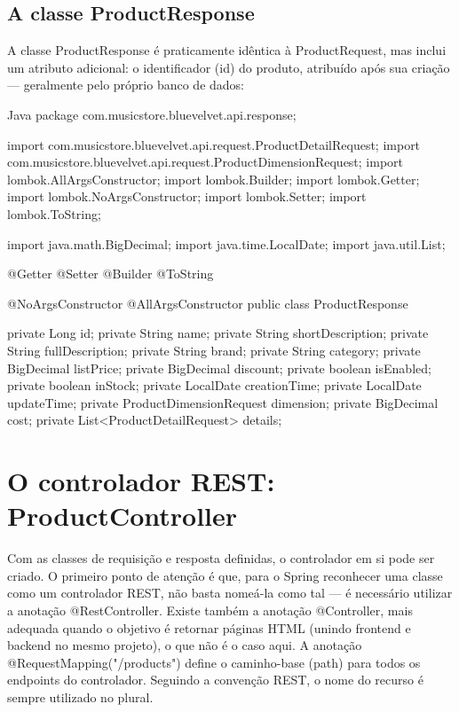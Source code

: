 \subsection{A classe ProductResponse}

A classe ProductResponse é praticamente idêntica à ProductRequest, mas inclui um atributo adicional: o identificador (id) do produto, atribuído após sua criação — geralmente pelo próprio banco de dados:

\begin{codebox}{Java}
package com.musicstore.bluevelvet.api.response;

import com.musicstore.bluevelvet.api.request.ProductDetailRequest;
import com.musicstore.bluevelvet.api.request.ProductDimensionRequest;
import lombok.AllArgsConstructor;
import lombok.Builder;
import lombok.Getter;
import lombok.NoArgsConstructor;
import lombok.Setter;
import lombok.ToString;

import java.math.BigDecimal;
import java.time.LocalDate;
import java.util.List;

@Getter
@Setter
@Builder
@ToString



@NoArgsConstructor
@AllArgsConstructor
public class ProductResponse {

       private Long id;
       private String name;
       private String shortDescription;
       private String fullDescription;
       private String brand;
       private String category;
       private BigDecimal listPrice;
       private BigDecimal discount;
       private boolean isEnabled;
       private boolean inStock;
       private LocalDate creationTime;
       private LocalDate updateTime;
       private ProductDimensionRequest dimension;
       private BigDecimal cost;
       private List<ProductDetailRequest> details;

}
\end{codebox}

\section{O controlador REST: ProductController}

Com as classes de requisição e resposta definidas, o controlador em si pode ser criado. O primeiro ponto de atenção é que, para o Spring reconhecer uma classe como um controlador REST, não basta nomeá-la como tal — é necessário utilizar a anotação @RestController. Existe também a anotação @Controller, mais adequada quando o objetivo é retornar páginas HTML (unindo frontend e backend no mesmo projeto), o que não é o caso aqui. A anotação @RequestMapping("/products") define o caminho-base (path) para todos os endpoints do controlador. Seguindo a convenção REST, o nome do recurso é sempre utilizado no plural.

